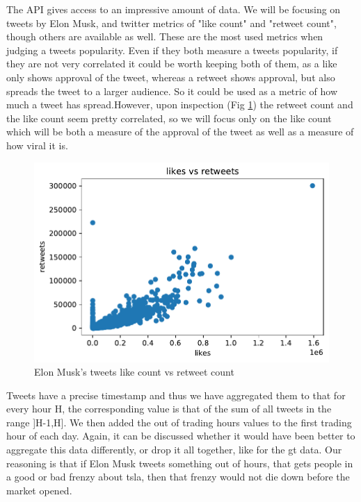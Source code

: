 The API gives access to an impressive amount of data. We will be focusing on tweets by Elon Musk, and twitter metrics of "like count" and "retweet count", though others are available as well. These are the most used metrics when judging a tweets popularity.
Even if they both measure a tweets popularity, if they are not very correlated it could be worth keeping both of them, as a like only shows approval of the tweet, whereas a retweet shows approval, but also spreads the tweet to a larger audience. So it could be used as a metric of how much a tweet has spread.However, upon inspection (Fig  \ref{fig:likeretweets}) the retweet count and the like count seem pretty correlated, so we will focus only on the like count which will be both a measure of the approval of the tweet as well as a measure of how viral it is.

\begin{figure}[h]
	\centering
	\includegraphics[width=\textwidth]{img/img_likeretweets.pdf}
	\caption{Elon Musk's tweets like count vs retweet count}
	\label{fig:likeretweets}
\end{figure}


Tweets have a precise timestamp and thus we have aggregated them to that for every hour H, the corresponding value is that of the sum of all tweets in the range ]H-1,H]. We then added the out of trading hours values to the first trading hour of each day. Again, it can be discussed whether it would have been better to aggregate this data differently, or drop it all together, like for the \acrlong{gt} data. Our reasoning is that if Elon Musk tweets something out of hours, that gets people in a good or bad frenzy about \acrshort{tsla}, then that frenzy would not die down before the market opened.

